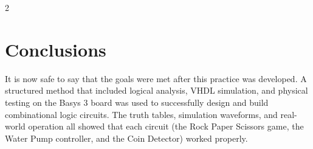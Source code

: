 \documentclass{article}
\begin{document}
\begin{multicols}{2}
\section{Conclusions}\label{Conclusion}
It is now safe to say that the goals were met after this practice was developed.  A structured method that included logical analysis, VHDL simulation, and physical testing on the Basys 3 board was used to successfully design and build combinational logic circuits. 
 The truth tables, simulation waveforms, and real-world operation all showed that each circuit (the Rock Paper Scissors game, the Water Pump controller, and the Coin Detector) worked properly.

\end{multicols}
\end{document}
